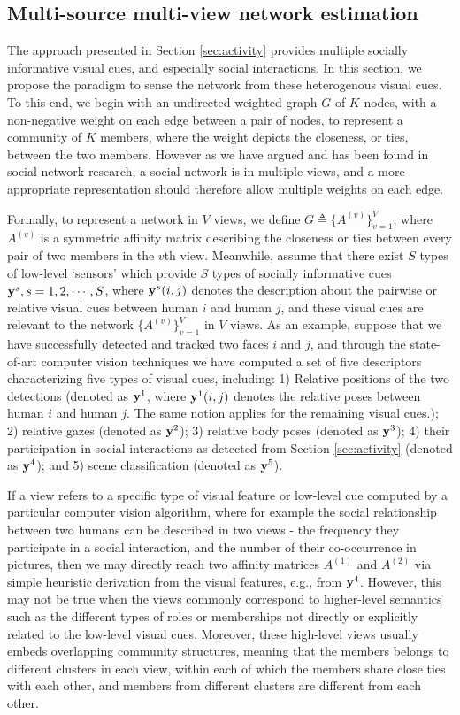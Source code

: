 \subsection{Multi-source multi-view network estimation}
\label{sec:vis2net}

The approach presented in Section \ref{sec:activity} provides multiple socially informative visual cues, and especially social interactions. In this section, we propose the paradigm to sense the network from these heterogenous visual cues. To this end, we begin with an undirected weighted graph $G$ of $K$ nodes, with a non-negative weight on each edge between a pair of nodes, to represent a community of $K$ members, where the weight depicts the closeness, or ties, between the two members. However as we have argued and has been found in social network research, a social network is in multiple views, and a more appropriate representation should therefore allow multiple weights on each edge. 

Formally, to represent a network in $V$ views, we define $G\triangleq\{A^{(v)}\}_{v=1}^{V}$, where $A^{(v)}$ is a symmetric affinity matrix describing the closeness or ties between every pair of two members in the $v$th view. Meanwhile, assume that there exist $S$ types of low-level `sensors' which provide $S$ types of socially informative cues ${\bf y}^s, s=1,2,\cdots,S$, where ${\bf y}^s(i,j)$ denotes the description about the pairwise or relative visual cues between human $i$ and human $j$, and these visual cues are relevant to the network $\{A^{(v)}\}_{v=1}^{V}$ in $V$ views. As an example, suppose that we have successfully detected and tracked two faces $i$ and $j$, and through the state-of-art computer vision techniques we have computed a set of five descriptors characterizing five types of visual cues, including: 1) Relative positions of the two detections (denoted as ${\bf y}^1$, where ${\bf y}^1(i,j)$ denotes the relative poses between human $i$ and human $j$. The same notion applies for the remaining visual cues.); 2) relative gazes (denoted as ${\bf y}^2$); 3) relative body poses (denoted as ${\bf y}^3$); 4) their participation in social interactions as detected from Section \ref{sec:activity} (denoted as ${\bf y}^4$); and 5) scene classification (denoted as ${\bf y}^5$).

If a view refers to a specific type of visual feature or low-level cue computed by a particular computer vision algorithm, where for example the social relationship between two humans can be described in two views - the frequency they participate in a social interaction, and the number of their co-occurrence in pictures, then we may directly reach two affinity matrices $A^{(1)}$ and $A^{(2)}$ via simple heuristic derivation from the visual features, e.g., from ${\bf y}^4$.  However, this may not be true when the views commonly correspond to higher-level semantics such as the different types of roles or memberships \cite{AiroldiBFX08,Kim12} not directly or explicitly related to the low-level visual cues.  Moreover, these high-level views usually embeds overlapping community structures, meaning that the members belongs to different clusters in each view, within each of which the members share close ties with each other, and members from different clusters are different from each other. 

